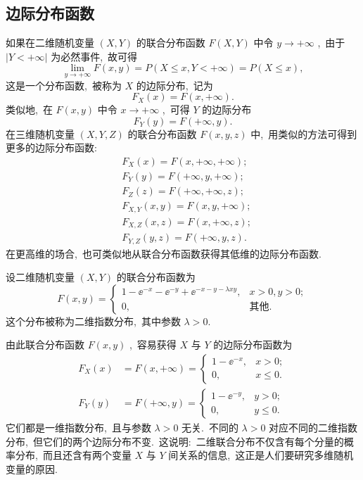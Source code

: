   \subsection{边际分布函数}\label{ssec:3.2.1}
  如果在二维随机变量 $(X,Y)$ 的联合分布函数 $F(X,Y)$ 中令 $y\to+\infty$ ,\ 由于 $|Y<+\infty|$ 为必然事件,\ 故可得
  \begin{equation*}
  \lim_{y\to+\infty}F(x,y)=P(X\leqslant x,Y<+\infty)=P(X\leqslant x),
  \end{equation*}
  这是一个分布函数,\ 被称为 $X$ 的边际分布,\ 记为
  \begin{equation}
  F_{X}(x)=F(x,+\infty).\label{eq:3.2.1}
  \end{equation}
  类似地,\ 在 $F(x,y)$ 中令 $x\to+\infty$ ,\ 可得 $Y$ 的边际分布
  \begin{equation}
  F_{Y}(y)=F(+\infty,y).\label{eq:3.2.2}
  \end{equation}
  在三维随机变量 $(X,Y,Z)$ 的联合分布函数 $F(x,y,z)$ 中,\ 用类似的方法可得到更多的边际分布函数:
  \begin{align*}
  &F_{X}(x) = F(x,+\infty,+\infty);\\
  &F_{Y}(y) = F(+\infty,y,+\infty);\\
  &F_{Z}(z) = F(+\infty,+\infty,z);\\
  &F_{X,Y}(x,y) = F(x,y,+\infty);\\
  &F_{X,Z}(x,z) = F(x,+\infty,z);\\
  &F_{Y,Z}(y,z) = F(+\infty,y,z).
  \end{align*}
  在更高维的场合,\ 也可类似地从联合分布函数获得其低维的边际分布函数.
  \begin{example}\label{exam:3.2.1}
  	设二维随机变量 $(X,Y)$ 的联合分布函数为
  	\begin{equation*}
  	F(x,y)=
  	\begin{cases}
  	1-\ee^{-x}-\ee^{-y}+\ee^{-x-y-\lambda xy}, & x>0,y>0;\\
  	0, & \text{其他}.
  	\end{cases}
  	\end{equation*}
  	这个分布被称为二维指数分布,\ 其中参数 $\lambda>0$.
  	
  	由此联合分布函数 $F(x,y)$ ,\ 容易获得 $X$ 与 $Y$ 的边际分布函数为
  	\begin{align*}
  	F_{X}(x) &= F(x,+\infty)=
  	\begin{cases}
  	1-\ee^{-x}, & x>0;\\
  	0, & x\leqslant0.
  	\end{cases}\\
  	F_{Y}(y) &= F(+\infty,y)=
  	\begin{cases}
  	1-\ee^{-y}, & y>0;\\
  	0, & y\leqslant0.
  	\end{cases}
  	\end{align*}
  	它们都是一维指数分布,\ 且与参数 $\lambda>0$ 无关.\ 不同的 $\lambda>0$ 对应不同的二维指数分布,\ 但它们的两个边际分布不变.\ 这说明:\ 二维联合分布不仅含有每个分量的概率分布,\ 而且还含有两个变量 $X$ 与 $Y$ 间关系的信息,\ 这正是人们要研究多维随机变量的原因.
  \end{example}
  
